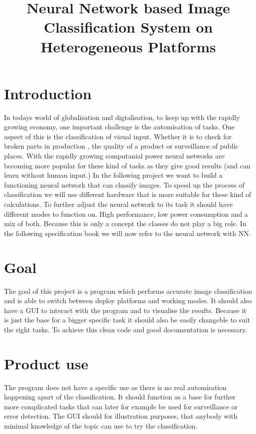 \documentclass[parskip=full]{scrartcl}
\title{Neural Network based Image Classification System on Heterogeneous Platforms}
\author{}
\begin{document}
\maketitle

\section{Introduction}
In todays world of globalisation and digtalisation, to keep up with the rapidly growing economy, one important challenge is the automisation of tasks. One aspect of this is the classification of visual input. Whether it is to check for broken parts in production , the quality of a product or surveillance of public places. With the rapidly growing computanial power neural networks are becoming more popular for these kind of tasks as they give good results (and can learn without human input.) In the following project we want to build a functioning neural network that can classify images. To speed up the process of classification we will use different hardware that is more suitable for these kind of calculations. To further adjust the neural network to its task it should have different modes to function on. High performance, low power consumption and a mix of both. Because this is only a concept the classes do not play a big role. In the following specification book we will now refer to the neural network with NN.


\section{Goal}
The goal of this project is a program which performs accurate image classification and is able to switch between deploy platforms and working modes.
It should also have a GUI to interact with the program and to visualise the results.
Because it is just the base for a bigger specific task it should also be easily changeble to suit the right tasks. To achieve this clean code and good documentation is necessary.


\section{Product use}
The program does not have a specific use as there is no real automisation happening apart of the classification. It should function as a base for further more complicated tasks that can later for example be used for surveillance or error detection. The GUI should for illustration purposes, that anybody with minimal knowledge of the topic can use to try the classification.
\end{document}
